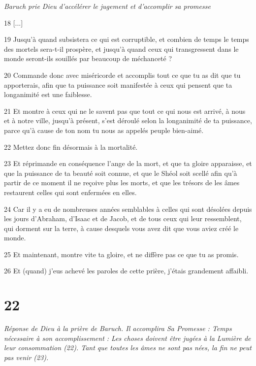 \par \textit{Baruch prie Dieu d'accélérer le jugement et d'accomplir sa promesse}

\par 18 [...]

\par 19 Jusqu'à quand subsistera ce qui est corruptible, et combien de temps le temps des mortels sera-t-il prospère, et jusqu'à quand ceux qui transgressent dans le monde seront-ils souillés par beaucoup de méchanceté ?

\par 20 Commande donc avec miséricorde et accomplis tout ce que tu as dit que tu apporterais, afin que ta puissance soit manifestée à ceux qui pensent que ta longanimité est une faiblesse.

\par 21 Et montre à ceux qui ne le savent pas que tout ce qui nous est arrivé, à nous et à notre ville, jusqu'à présent, s'est déroulé selon la longanimité de ta puissance, parce qu'à cause de ton nom tu nous as appelés peuple bien-aimé.

\par 22 Mettez donc fin désormais à la mortalité.

\par 23 Et réprimande en conséquence l'ange de la mort, et que ta gloire apparaisse, et que la puissance de ta beauté soit connue, et que le Shéol soit scellé afin qu'à partir de ce moment il ne reçoive plus les morts, et que les trésors de les âmes restaurent celles qui sont enfermées en elles.

\par 24 Car il y a eu de nombreuses années semblables à celles qui sont désolées depuis les jours d'Abraham, d'Isaac et de Jacob, et de tous ceux qui leur ressemblent, qui dorment sur la terre, à cause desquels vous avez dit que vous aviez créé le monde.

\par 25 Et maintenant, montre vite ta gloire, et ne diffère pas ce que tu as promis.

\par 26 Et (quand) j'eus achevé les paroles de cette prière, j'étais grandement affaibli.

\chapter{22}

\par \textit{Réponse de Dieu à la prière de Baruch. Il accomplira Sa Promesse : Temps nécessaire à son accomplissement : Les choses doivent être jugées à la Lumière de leur consommation (22). Tant que toutes les âmes ne sont pas nées, la fin ne peut pas venir (23).}


